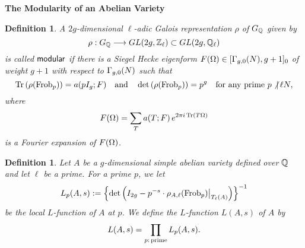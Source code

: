 \documentclass[11pt]{amsart}
\newtheorem{definition}[theorem]{Definition}
\begin{document}
\begin{section}{{\bf The Modularity of an Abelian Variety}}
\begin{definition}\label{def:2.4}
A $2g$-dimensional $\ell$-adic Galois representation $\rho$ of $G_\mathbb Q$ given by
$$
\rho:G_\mathbb Q\longrightarrow GL(2g,\mathbb Z_\ell)\subset GL(2g,\mathbb Q_\ell)
$$
is called $\sf{modular}$ if there is a Siegel Hecke eigenform $F(\Omega)\in [\Gamma_{g,0}(N), g+1]_0$
of weight $g+1$ with respect to $\Gamma_{g,0}(N)$ such that
\begin{equation*}
  {\rm Tr}\left( \rho({\rm Frob}_p)\right)=a(pI_g;F)\quad {\rm and}\quad
  \det \left( \rho({\rm Frob}_p)\right)=p^g\quad {\rm for\ any\ prime}\ p\not|\, \ell N,
\end{equation*}
where
\begin{equation*}
  F(\Omega)=\sum_{T} a(T;F)\,e^{2\pi i\,{\rm Tr}(T\Omega)}
\end{equation*}
is a Fourier expansion of $F(\Omega)$.
\end{definition}

\begin{definition}\label{def:2.5}
Let $A$ be a $g$-dimensional simple abelian variety defined over $\mathbb Q$ and let $\ell$ be a prime.
 For a prime $p$, we let
\begin{equation*}
  L_p(A,s):=\left\{ \det\left( I_{2g}-p^{-s}\cdot
  \rho_{A,\ell}({\rm Frob}_p)\big|_{T_{\ell}(A)}\right)\right\}^{-1}
\end{equation*}
be the local $L$-function of $A$ at $p$. We define the $L$-function $L(A,s)$ of $A$ by
\begin{equation*}
  L(A,s)=\prod_{p:\,{\rm prime}}L_p(A,s).
\end{equation*}
\end{definition}


\end{section}
\end{document}
